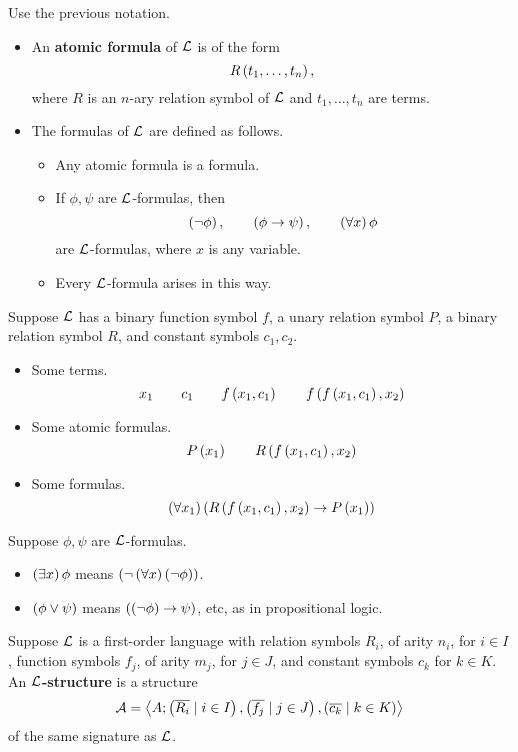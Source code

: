 
\begin{definition}
Use the previous notation.
\begin{itemize}
\item An \textbf{atomic formula} of $ \mathcal{L} $ is of the form
$$ R\left( t_1, \dots, t_n \right), $$
where $ R $ is an $ n $-ary relation symbol of $ \mathcal{L} $ and $ t_1, \dots, t_n $ are terms.
\item The formulas of $ \mathcal{L} $ are defined as follows.
\begin{itemize}
\item Any atomic formula is a formula.
\item If $ \phi, \psi $ are $ \mathcal{L} $-formulas, then
$$ \left( \neg \phi \right), \qquad \left( \phi \rightarrow \psi \right), \qquad \left( \forall x \right)\phi $$
are $ \mathcal{L} $-formulas, where $ x $ is any variable.
\item Every $ \mathcal{L} $-formula arises in this way.
\end{itemize}
\end{itemize}
\end{definition}

\begin{example*}
Suppose $ \mathcal{L} $ has a binary function symbol $ f $, a unary relation symbol $ P $, a binary relation symbol $ R $, and constant symbols $ c_1, c_2 $.
\begin{itemize}
\item Some terms.
$$ x_1 \qquad c_1 \qquad f\left( x_1, c_1 \right) \qquad f\left( f\left( x_1, c_1 \right), x_2 \right) $$
\item Some atomic formulas.
$$ P\left( x_1 \right) \qquad R\left( f\left( x_1, c_1 \right), x_2 \right) $$
\item Some formulas.
$$ \left( \forall x_1 \right)\left( R\left( f\left( x_1, c_1 \right), x_2 \right) \rightarrow P\left( x_1 \right) \right) $$
\end{itemize}
\end{example*}

\begin{definition}
Suppose $ \phi, \psi $ are $ \mathcal{L} $-formulas.
\begin{itemize}
\item $ \left( \exists x \right)\phi $ means $ \left( \neg \left( \forall x \right)\left( \neg \phi \right) \right) $.
\item $ \left( \phi \lor \psi \right) $ means $ \left( \left( \neg \phi \right) \rightarrow \psi \right) $, etc, as in propositional logic.
\end{itemize}
\end{definition}

\pagebreak

\begin{definition}
Suppose $ \mathcal{L} $ is a first-order language with relation symbols $ R_i $, of arity $ n_i $, for $ i \in I $, function symbols $ f_j $, of arity $ m_j $, for $ j \in J $, and constant symbols $ c_k $ for $ k \in K $. An \textbf{$ \mathcal{L} $-structure} is a structure
$$ \mathcal{A} = \left\langle A; \left( \overline{R_i} \mid i \in I \right), \left( \overline{f_j} \mid j \in J \right), \left( \overline{c_k} \mid k \in K \right) \right\rangle $$
of the same signature as $ \mathcal{L} $.
\end{definition}

